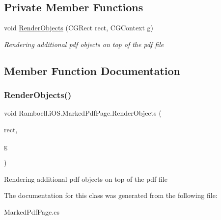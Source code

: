 \subsection*{Private Member Functions}
\begin{DoxyCompactItemize}
\item 
void \hyperlink{class_ramboell_1_1i_o_s_1_1_marked_pdf_page_af4192c26d130c4f362c33e089f96c893}{Render\+Objects} (C\+G\+Rect rect, C\+G\+Context g)
\begin{DoxyCompactList}\small\item\em Rendering additional pdf objects on top of the pdf file \end{DoxyCompactList}\end{DoxyCompactItemize}


\subsection{Member Function Documentation}
\mbox{\label{class_ramboell_1_1i_o_s_1_1_marked_pdf_page_af4192c26d130c4f362c33e089f96c893}} 
\subsubsection{\texorpdfstring{Render\+Objects()}{RenderObjects()}}
{\footnotesize\ttfamily void Ramboell.\+i\+O\+S.\+Marked\+Pdf\+Page.\+Render\+Objects (\begin{DoxyParamCaption}\item[{C\+G\+Rect}]{rect,  }\item[{C\+G\+Context}]{g }\end{DoxyParamCaption})\hspace{0.3cm}{\ttfamily [private]}}



Rendering additional pdf objects on top of the pdf file 



The documentation for this class was generated from the following file\+:\begin{DoxyCompactItemize}
\item 
Marked\+Pdf\+Page.\+cs\end{DoxyCompactItemize}
